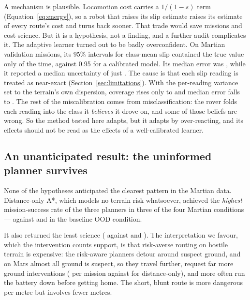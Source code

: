 \documentclass[11pt]{article}
\begin{document}
A mechanism is plausible. Locomotion cost carries a $1/(1-s)$ term
(Equation~\ref{eq:energy}), so a robot that raises its slip estimate raises its
estimate of every route's cost and turns back sooner. That trade would save
missions and cost science. But it is a hypothesis, not a finding, and a further
audit complicates it. The adaptive learner turned out to be badly
overconfident. On \AuditCalibrationMissions{} Martian validation missions, its
95\% intervals for class-mean slip contained the true value only
\AuditCoverageCommitted{} of the time, against 0.95 for a calibrated model. Its
median error was \AuditErrorCommitted{}, while it reported a median
uncertainty of just \AuditSdCommitted{}. The cause is that each slip reading is
treated as near-exact (Section~\ref{sec:limitations}). With the per-reading
variance set to the terrain's own dispersion, coverage rises only to
\AuditCoverageCorrected{} and median error falls to \AuditErrorCorrected{}. The
rest of the miscalibration comes from misclassification: the rover folds each
reading into the class it \emph{believes} it drove on, and some of those beliefs
are wrong. So
the method tested here adapts, but it adapts by over-reacting, and its effects
should not be read as the effects of a well-calibrated learner.

\subsection{An unanticipated result: the uninformed planner survives}

None of the hypotheses anticipated the clearest pattern in the Martian data.
Distance-only A*, which models no terrain risk whatsoever, achieved the
\emph{highest} mission-success rate of the three planners in three of the four
Martian conditions --- \MainMarsOODAstarSuccess{} against
\MainMarsOODFixedSuccess{} and \MainMarsOODAdaptiveSuccess{} in the baseline
OOD condition.

It also returned the least science (\MainMarsOODAstarScience{} against
\MainMarsOODFixedScience{} and \MainMarsOODAdaptiveScience{}). The
interpretation we favour, which the intervention counts support, is that
risk-averse routing on hostile terrain is expensive: the risk-aware planners
detour around suspect ground, and on Mars almost all ground is suspect, so
they travel further, request far more ground interventions
(\MainMarsOODFixedInterventions{} per mission against
\MainMarsOODAstarInterventions{} for distance-only), and more often run the
battery down before getting home. The short, blunt route is more dangerous per
metre but involves fewer metres.
\end{document}
